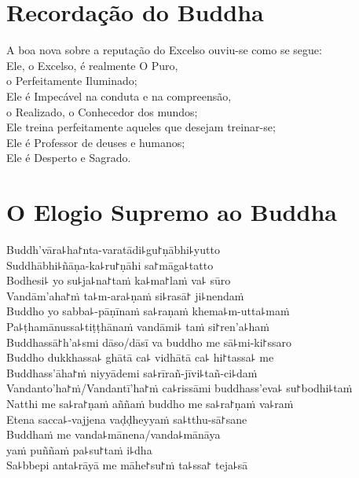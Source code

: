 \nextChapterUseDelegatedPageNumber

\chapter{Recordação do Buddha}

\begin{leader}
\end{leader}

A boa nova sobre a reputação do Excelso ouviu-se como se segue:\\
Ele, o Excelso, é realmente O Puro,\\
\vin o Perfeitamente Iluminado;\\
Ele é Impecável na conduta e na compreensão,\\
\vin o Realizado, o Conhecedor dos mundos;\\
Ele treina perfeitamente aqueles que desejam treinar-se;\\
Ele é Professor de deuses e humanos;\\
Ele é Desperto e Sagrado.

\clearpage

\chapter*{O Elogio Supremo ao Buddha}

\delegateSetUseNext

\begin{leader}
\end{leader}

Buddh'vāra꜕ha꜓nta-varatādi꜕gu꜓ṇābhi꜕yutto\\
Suddhābhi꜕ñāṇa-ka꜕ru꜓ṇāhi sa꜓māga꜕tatto\\
Bodhesi꜕ yo su꜕ja꜕na꜓taṁ ka꜕ma꜓laṁ va꜕ sūro\\
Vandām'aha꜓ṁ ta꜕m-ara꜕ṇaṁ si꜕rasā꜓ ji꜕nendaṁ\\
Buddho yo sabba꜕-pāṇīnaṁ sa꜕raṇaṁ khema꜕m-utta꜕maṁ\\
Pa꜕ṭhamānussa꜕tiṭṭhānaṁ vandāmi꜕ taṁ si꜓ren'a꜕haṁ\\
Buddhassā꜓h'a꜕smi dāso/dāsī va buddho me sā꜕mi-ki꜓ssaro\\
Buddho dukkhassa꜕ ghātā ca꜕ vidhātā ca꜕ hi꜓tassa꜕ me\\
Buddhass'āha꜓ṁ niyyādemi sa꜕rīrañ-jīvi꜕tañ-ci꜕daṁ\\
Vandanto'ha꜓ṁ/Vandantī'ha꜓ṁ ca꜕rissāmi buddhass'eva꜕ su꜓bodhi꜕taṁ\\
Natthi me sa꜕ra꜓ṇaṁ aññaṁ buddho me sa꜕ra꜓ṇaṁ va꜕raṁ\\
Etena sacca꜕-vajjena vaḍḍheyyaṁ sa꜕tthu-sā꜓sane\\
Buddhaṁ me vanda꜕mānena/vanda꜕mānāya\\
\vin yaṁ puññaṁ pa꜕su꜓taṁ i꜕dha\\
Sa꜕bbepi anta꜕rāyā me māhe꜓su꜓ṁ ta꜕ssa꜓ teja꜕sā

